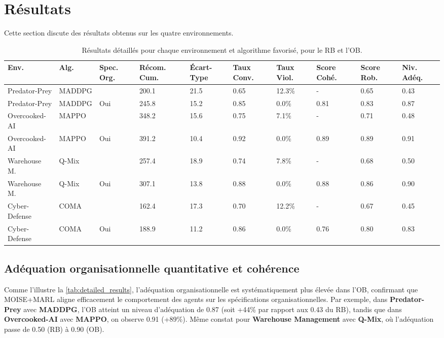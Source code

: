 \documentclass[dissemination]{jfsma}
\begin{document}
\section{Résultats}
\label{sec:results}

Cette section discute des résultats obtenus sur les quatre environnements.

\begin{table*}[h!]
    \centering
    \caption{Résultats détaillés pour chaque environnement et algorithme favorisé, pour le RB et l'OB.}
    \label{tab:detailed_results}
    \footnotesize
    \renewcommand{\arraystretch}{1.2}
    \begin{tabular}{p{2.2cm}p{1.6cm}p{.8cm}p{1.3cm}p{1cm}p{1.3cm}p{1.3cm}p{1.2cm}p{}p{0.8cm}}
        \hline
        \textbf{Env.} & \textbf{Alg.} & \textbf{Spec. Org.} & \textbf{Récom. Cum.} & \textbf{Écart-Type} & \textbf{Taux Conv.} & \textbf{Taux Viol.} & \textbf{Score Cohé.} & \textbf{Score Rob.} & \textbf{Niv. Adéq.} \\ \hline
        Predator-Prey & MADDPG &  & 200.1 & 21.5 & 0.65 & 12.3\% & - & 0.65 & 0.43 \\
        Predator-Prey & MADDPG & Oui & 245.8 & 15.2 & 0.85 & 0.0\% & 0.81 & 0.83 & 0.87 \\
        Overcooked-AI & MAPPO &  & 348.2 & 15.6 & 0.75 & 7.1\% & - & 0.71 & 0.48 \\
        Overcooked-AI & MAPPO & Oui & 391.2 & 10.4 & 0.92 & 0.0\% & 0.89 & 0.89 & 0.91 \\
        Warehouse M. & Q-Mix &  & 257.4 & 18.9 & 0.74 & 7.8\% & - & 0.68 & 0.50 \\
        Warehouse M. & Q-Mix & Oui & 307.1 & 13.8 & 0.88 & 0.0\% & 0.88 & 0.86 & 0.90 \\
        Cyber-Defense & COMA &  & 162.4 & 17.3 & 0.70 & 12.2\% & - & 0.67 & 0.45 \\
        Cyber-Defense & COMA & Oui & 188.9 & 11.2 & 0.86 & 0.0\% & 0.76 & 0.80 & 0.83 \\ \hline
    \end{tabular}
\end{table*}

\subsection{Adéquation organisationnelle quantitative et cohérence}

\noindent
Comme l'illustre la \autoref{tab:detailed_results}, l'adéquation organisationnelle est systématiquement plus élevée dans l'OB, confirmant que MOISE+MARL aligne efficacement le comportement des agents sur les spécifications organisationnelles. 
Par exemple, dans \textbf{Predator-Prey} avec \textbf{MADDPG}, l'OB atteint un niveau d'adéquation de 0.87 (soit +44\% par rapport aux 0.43 du RB), tandis que dans \textbf{Overcooked-AI} avec \textbf{MAPPO}, on observe 0.91 (+89\%). Même constat pour \textbf{Warehouse Management} avec \textbf{Q-Mix}, où l'adéquation passe de 0.50 (RB) à 0.90 (OB).
\end{document}
